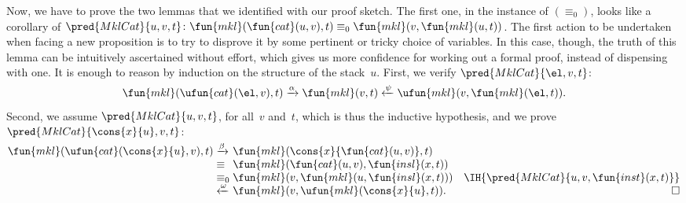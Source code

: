 Now, we have to prove the two lemmas that we identified with our proof
sketch. The first one, in the instance of \((\equiv_0)\), looks like a
corollary of \(\pred{MklCat}{u,v,t}
\colon \fun{mkl}(\fun{cat}(u,v),t) \equiv_0
\fun{mkl}(v,\fun{mkl}(u,t))\). The first action to be undertaken when
facing a new proposition is to try to disprove it by some pertinent or
tricky choice of variables. In this case, though, the truth of this
lemma can be intuitively ascertained without effort, which gives us
more confidence for working out a formal proof, instead of dispensing
with one. It is enough to reason by induction on the structure of the
stack~\(u\). First, we verify \(\pred{MklCat}{\el,v,t}\):
\begin{equation*}
\fun{mkl}(\ufun{cat}(\el,v),t)
  \xrightarrow{\smash{\alpha}} \fun{mkl}(v,t)
  \xleftarrow{\smash{\psi}} \ufun{mkl}(v,\fun{mkl}(\el,t)).
\end{equation*}
Second, we assume \(\pred{MklCat}{u,v,t}\), for all~\(v\) and~\(t\),
which is thus the inductive hypothesis, and we prove
\(\pred{MklCat}{\cons{x}{u},v,t}\):
\begin{equation*}
  \begin{array}{@{}r@{\;}l@{\;}l@{\quad}r@{}}
  \fun{mkl}(\ufun{cat}(\cons{x}{u},v),t)
& \xrightarrow{\smash{\beta}} &
  \fun{mkl}(\cons{x}{\fun{cat}(u,v)},t)\\
& \equiv &
  \fun{mkl}(\fun{cat}(u,v),\fun{insl}(x,t))\\
& \equiv_0 & \fun{mkl}(v,\fun{mkl}(u,\fun{insl}(x,t)))
& \IH{\pred{MklCat}{u,v,\fun{inst}(x,t)}}\\
& \xleftarrow{\smash{\omega}} &
  \fun{mkl}(v,\ufun{mkl}(\cons{x}{u},t)). & \hfill\Box
\end{array}
\end{equation*}

